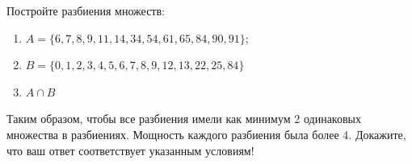 \question
Постройте разбиения множеств:
\begin{enumerate}
	\renewcommand{\labelenumi}{\alph{enumi})}
	\item $A = \{6, 7, 8, 9, 11, 14, 34, 54, 61, 65, 84,90, 91\};$
	\item $B = \{0, 1, 2, 3, 4, 5, 6, 7, 8, 9, 12, 13, 22, 25, 84\}$
	\item $A \cap B$
\end{enumerate}
Таким образом, чтобы все разбиения имели как минимум 2 одинаковых множества в разбиениях.
Мощность каждого разбиения была более 4.
Докажите, что ваш ответ соответствует указанным условиям!
